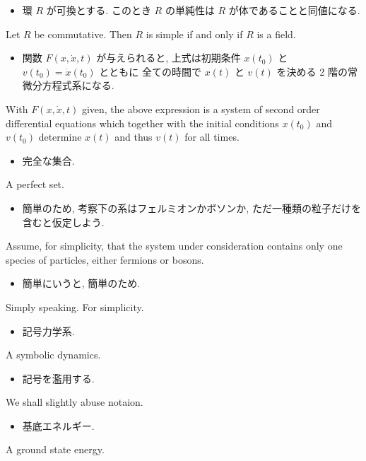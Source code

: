 \documentclass[openany, a4paper, oneside]{jsbook}
\begin{document}
\begin{itemize}
\item 環 $R$ が可換とする. このとき $R$ の単純性は $R$ が体であることと同値になる.
\end{itemize}
Let $R$ be commutative.
Then $R$ is simple if and only if $R$ is a field.

\begin{itemize}
\item 関数 $F(x, \dot{x}, t)$ が与えられると, 上式は初期条件 $x(t_0)$ と $v(t_0) = \dot{x}(t_0)$ とともに
全ての時間で $x(t)$ と $v(t)$ を決める 2 階の常微分方程式系になる. \cite{LiebSeiringer1}
\end{itemize}
With $F(x, \dot{x}, t)$ given, the above expression is a system of second order
differential equations which together with the initial conditions
$x(t_0)$ and $v(t_0)$ determine $x(t)$ and thus $v(t)$ for all times.

\begin{itemize}
\item 完全な集合.
\end{itemize}
A perfect set.

\begin{itemize}
\item 簡単のため, 考察下の系はフェルミオンかボソンか, ただ一種類の粒子だけを含むと仮定しよう. \cite{LiebSeiringer1}
\end{itemize}
Assume, for simplicity, that the system under consideration contains only one species of particles,
either fermions or bosons.

\begin{itemize}
\item 簡単にいうと, 簡単のため. \cite{LiebSeiringer1}
\end{itemize}
Simply speaking.
For simplicity.

\begin{itemize}
\item 記号力学系.
\end{itemize}
A symbolic dynamics.

\begin{itemize}
\item 記号を濫用する. \cite{LiebSeiringer1}
\end{itemize}
We shall slightly abuse notaion.

\begin{itemize}
\item 基底エネルギー.
\end{itemize}
A ground state energy.
\end{document}
